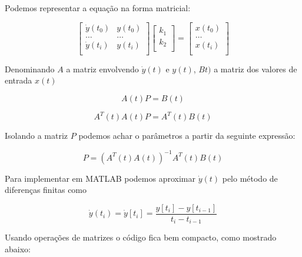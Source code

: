 \documentclass[a4paper,11pt]{article}
\begin{document}

Podemos representar a equação na forma matricial:

\begin{equation}
\left[\begin{array}{cc}
    \dot{y}(t_0) & y(t_0)\\
    \dots  & \dots \\
    \dot{y}(t_i) & y(t_i)\\
\end{array} \right]
\left[\begin{array}{c}
    k_1\\
    k_2\\
\end{array} \right]
=
\left[\begin{array}{c}
    x(t_0)  \\
    \dots\\
    x(t_i)  \\
\end{array} \right]
\end{equation}


Denominando $A$ a matriz envolvendo $\dot{y}(t)$ e $y(t)$, $Bt)$ a matriz dos valores de entrada $x(t)$

\begin{equation}
    A(t) P = B(t)
\end{equation}

\begin{equation}
    A^T(t)A(t) P = A^T(t) B(t)
\end{equation}

Isolando a matriz $P$ podemos achar o parâmetros a partir da seguinte expressão:

\begin{equation}
    P = \left(A^T(t) A(t)\right)^{-1} A^T(t) B(t)
\end{equation}

Para implementar em MATLAB podemos aproximar $\dot{y}(t)$ pelo método de diferenças finitas como

\begin{equation}
\dot{y}(t_i) = \dot{y}[t_i] = \frac{y[t_i] - y[t_{i-1}]}{t_i - t_{i-1}}
\end{equation}

Usando operações de matrizes o código fica bem compacto, como mostrado abaixo:

\inputminted[frame=single,framesep=10pt]{matlab}{../src/matlab/firstordertf.m}
\end{document}
